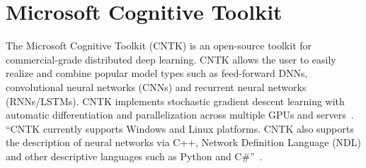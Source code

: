 \section{Microsoft Cognitive Toolkit}

The Microsoft Cognitive Toolkit (CNTK) is an open-source toolkit for commercial-grade distributed deep learning. CNTK allows the user to easily realize and combine popular model types such as feed-forward DNNs, convolutional neural networks (CNNs) and recurrent neural networks (RNNs/LSTMs). CNTK implements stochastic gradient descent learning with automatic differentiation and parallelization across multiple GPUs and servers~\cite{hid-sp18-510-web-cntk}. ``CNTK currently supports Windows and Linux platforms. CNTK also supports the description of neural networks via C++, Network Definition Language (NDL) and other descriptive languages such as Python and C\#''~\cite{hid-sp18-510-kd-cntk}.
